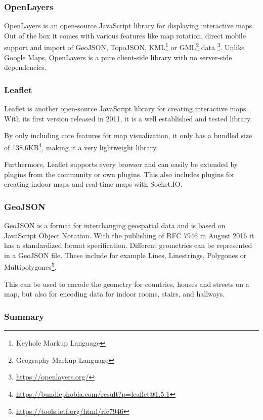 \subsubsection{OpenLayers}
\label{OpenLayers}

OpenLayers is an open-source JavaScript library for displaying interactive maps. Out of the box it comes with various features like map rotation, direct mobile support and import of GeoJSON, TopoJSON, KML\footnote{Keyhole Markup Language} or GML\footnote{Geography Markup Language} data \footnote{\url{https://openlayers.org/}}. Unlike Google Maps, OpenLayers is a pure client-side library with no server-side dependencies. 

\subsubsection{Leaflet}
\label{Leaflet}

Leaflet is another open-source JavaScript library for creating interactive maps. With its first version released in 2011, it is a well established and tested library. 

By only including core features for map visualization, it only has a bundled size of 138.6KB\footnote{\url{https://bundlephobia.com/result?p=leaflet@1.5.1}}, making it a very lightweight library.

Furthermore, Leaflet supports every browser and can easily be extended by plugins from the community or own plugins.
This also includes plugins for creating indoor maps \cite{baines_provides_2019} and real-time maps with Socket.IO.

\subsubsection{GeoJSON}
\label{GeoJSON}

GeoJSON is a format for interchanging geospatial data and is based on JavaScript Object Notation. With the publishing of RFC 7946 in August 2016 it has a standardized format specification.
Different geometries can be represented in a GeoJSON file. These include for example Lines, Linestrings, Polygones or Multipolygones\footnote{\url{https://tools.ietf.org/html/rfc7946}}. 

This can be used to encode the geometry for countries, houses and streets on a map, but also for encoding data for indoor rooms, stairs, and hallways.

\subsubsection{Summary}

